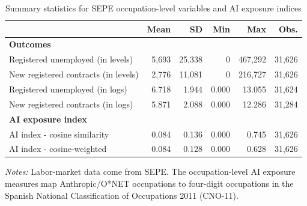 \begin{table}[H]
\centering
\begin{threeparttable}
\caption{Summary statistics for SEPE occupation-level variables and AI exposure indices}
\label{tab:summary_statistics}
\footnotesize
\begin{tabular}{lrrrrr}
\toprule
 & Mean & SD & Min & Max & Obs. \\
\midrule
\textbf{Outcomes} & & & & & \\
\hspace{0.3cm} Registered unemployed (in levels) & 5,693 & 25,338 & 0 & 467,292 & 31,626 \\
\hspace{0.3cm} New registered contracts (in levels) & 2,776 & 11,081 & 0 & 216,727 & 31,626 \\
\hspace{0.3cm} Registered unemployed (in logs) & 6.718 & 1.944 & 0.000 & 13.055 & 31,624 \\
\hspace{0.3cm} New registered contracts (in logs) & 5.871 & 2.088 & 0.000 & 12.286 & 31,284 \\
\textbf{AI exposure index} & & & & & \\
\hspace{0.3cm} AI index - cosine similarity & 0.084 & 0.136 & 0.000 & 0.745 & 31,626 \\
\hspace{0.3cm} AI index - cosine-weighted & 0.084 & 0.128 & 0.000 & 0.628 & 31,626 \\
\bottomrule
\end{tabular}
\begin{tablenotes}[flushleft]
\footnotesize
\item \emph{Notes:} Labor-market data come from SEPE. The occupation-level AI exposure measures map Anthropic/O*NET occupations to four-digit occupations in the Spanish National Classification of Occupations 2011 (CNO-11).
\end{tablenotes}
\end{threeparttable}
\end{table}
